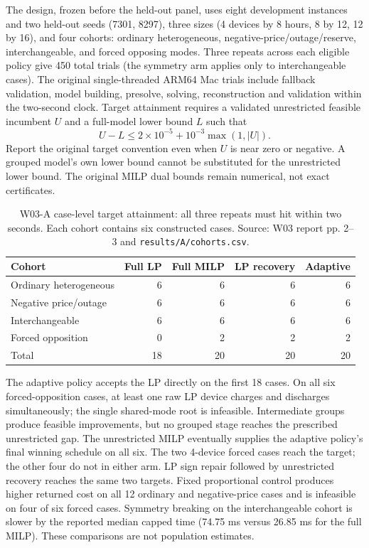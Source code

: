 \documentclass[11pt,letterpaper]{article}
\begin{document}
The design, frozen before the held-out panel, uses eight development instances and two held-out seeds (7301, 8297), three sizes (4 devices by 8 hours, 8 by 12, 12 by 16), and four cohorts: ordinary heterogeneous, negative-price/outage/reserve, interchangeable, and forced opposing modes. Three repeats across each eligible policy give 450 total trials (the symmetry arm applies only to interchangeable cases). The original single-threaded ARM64 Mac trials include fallback validation, model building, presolve, solving, reconstruction and validation within the two-second clock. Target attainment requires a validated unrestricted feasible incumbent $U$ and a full-model lower bound $L$ such that
\[
 U-L\le 2\times10^{-5}+10^{-3}\max(1,|U|).
\]
Report the original target convention even when $U$ is near zero or negative. A grouped model's own lower bound cannot be substituted for the unrestricted lower bound. The original MILP dual bounds remain numerical, not exact certificates.

\begin{table}[htbp]\centering\small
\caption{W03-A case-level target attainment: all three repeats must hit within two seconds. Each cohort contains six constructed cases. Source: W03 report pp. 2--3 and \texttt{results/A/cohorts.csv}.}\label{tab:w03a-hits}
\begin{tabular}{lrrrr}\toprule
Cohort & Full LP & Full MILP & LP recovery & Adaptive\\\midrule
Ordinary heterogeneous &6&6&6&6\\
Negative price/outage &6&6&6&6\\
Interchangeable &6&6&6&6\\
Forced opposition &0&2&2&2\\\midrule
Total &18&20&20&20\\\bottomrule\end{tabular}
\end{table}

The adaptive policy accepts the LP directly on the first 18 cases. On all six forced-opposition cases, at least one raw LP device charges and discharges simultaneously; the single shared-mode root is infeasible. Intermediate groups produce feasible improvements, but no grouped stage reaches the prescribed unrestricted gap. The unrestricted MILP eventually supplies the adaptive policy's final winning schedule on all six. The two 4-device forced cases reach the target; the other four do not in either arm. LP sign repair followed by unrestricted recovery reaches the same two targets. Fixed proportional control produces higher returned cost on all 12 ordinary and negative-price cases and is infeasible on four of six forced cases. Symmetry breaking on the interchangeable cohort is slower by the reported median capped time (74.75 ms versus 26.85 ms for the full MILP). These comparisons are not population estimates.
\end{document}
